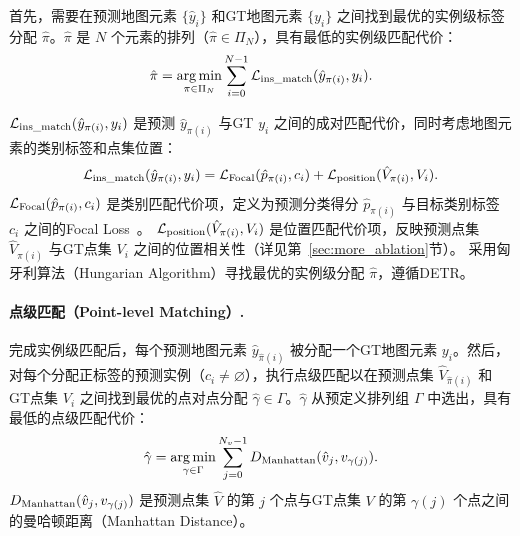 \documentclass{article} %
\begin{document}
首先，需要在预测地图元素 $\{\hat{y}_i \}$ 和GT地图元素 $\{y_i \}$ 之间找到最优的实例级标签分配 $\hat{\pi}$。$\hat{\pi}$ 是 $N$ 个元素的排列（$\hat{\pi} \in \Pi_N$），具有最低的实例级匹配代价：
\begin{equation}
\begin{gathered}
\hat{\pi} = \operatorname*{arg\,min}_{\pi \in \Pi_N} \sum_{i=0}^{N-1} \mathcal{L}_{\rm ins\_match} (\hat{y}_{\pi(i)}, y_i). \label{eq:argmin_inst_loss}
\end{gathered}
\end{equation}

$\mathcal{L}_{\rm ins\_match}(\hat{y}_{\pi(i)}, y_i)$ 是预测 $\hat{y}_{\pi(i)}$ 与GT $y_i$ 之间的成对匹配代价，同时考虑地图元素的类别标签和点集位置：
\begin{equation}
\begin{gathered}
\mathcal{L}_{\rm ins\_match}(\hat{y}_{{\pi}(i)},  y_i ) =
\mathcal{L}_{\rm{Focal}}(\hat{p}_{{\pi}(i)}, c_i) + \mathcal{L}_{\rm position}(\hat{V}_{\pi(i)}, V_i).
\end{gathered}
\end{equation}
$\mathcal{L}_{\rm{Focal}}(\hat{p}_{{\pi}(i)}, c_i)$ 是类别匹配代价项，定义为预测分类得分 $\hat{p}_{{\pi}(i)}$ 与目标类别标签 $c_i$ 之间的Focal Loss~\citep{focal}。
$\mathcal{L}_{\rm position}(\hat{V}_{\pi(i)}, V_i)$ 是位置匹配代价项，反映预测点集 $\hat{V}_{\pi(i)}$ 与GT点集 $V_i$ 之间的位置相关性（详见第~\ref{sec:more_ablation}节）。
采用匈牙利算法（Hungarian Algorithm）寻找最优的实例级分配 $\hat{\pi}$，遵循DETR。


\paragraph{点级匹配（Point-level Matching）.}
完成实例级匹配后，每个预测地图元素 $\hat{y}_{\hat{\pi}(i)}$ 被分配一个GT地图元素 $y_i$。然后，对每个分配正标签的预测实例（$c_i\neq\varnothing$），执行点级匹配以在预测点集 $\hat{V}_{\hat{\pi}(i)}$ 和GT点集 $V_{i}$ 之间找到最优的点对点分配 $\hat{\gamma} \in \Gamma$。$\hat{\gamma}$ 从预定义排列组 ${\Gamma}$ 中选出，具有最低的点级匹配代价：
\begin{equation}
\begin{gathered}
\hat{\gamma} = \operatorname*{arg\,min}_{\gamma \in {\Gamma}} \sum_{j=0}^{N_v-1} 
D_{\rm{Manhattan}}(\hat{v}_{j}, v_{ \gamma(j)}). \label{eq:argmin_pts_loss}
\end{gathered}
\end{equation}
$D_{\rm{Manhattan}}(\hat{v}_{j}, v_{ \gamma(j)})$ 是预测点集 $\hat{V}$ 的第 $j$ 个点与GT点集 $V$ 的第 $\gamma(j)$ 个点之间的曼哈顿距离（Manhattan Distance）。
\end{document}
